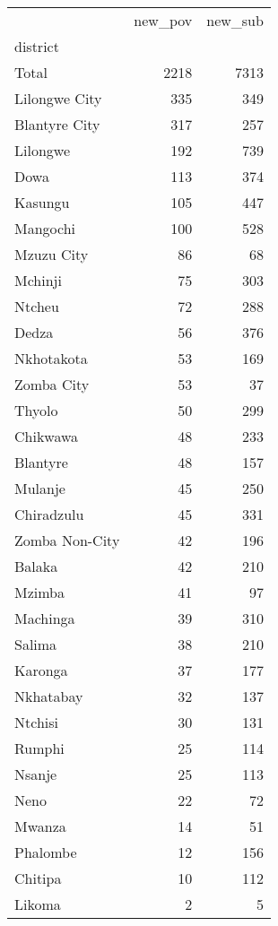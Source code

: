 \begin{tabular}{lrr}
\toprule
{} &  new\_pov &  new\_sub \\
district       &          &          \\
\midrule
Total          &     2218 &     7313 \\
Lilongwe City  &      335 &      349 \\
Blantyre City  &      317 &      257 \\
Lilongwe       &      192 &      739 \\
Dowa           &      113 &      374 \\
Kasungu        &      105 &      447 \\
Mangochi       &      100 &      528 \\
Mzuzu City     &       86 &       68 \\
Mchinji        &       75 &      303 \\
Ntcheu         &       72 &      288 \\
Dedza          &       56 &      376 \\
Nkhotakota     &       53 &      169 \\
Zomba City     &       53 &       37 \\
Thyolo         &       50 &      299 \\
Chikwawa       &       48 &      233 \\
Blantyre       &       48 &      157 \\
Mulanje        &       45 &      250 \\
Chiradzulu     &       45 &      331 \\
Zomba Non-City &       42 &      196 \\
Balaka         &       42 &      210 \\
Mzimba         &       41 &       97 \\
Machinga       &       39 &      310 \\
Salima         &       38 &      210 \\
Karonga        &       37 &      177 \\
Nkhatabay      &       32 &      137 \\
Ntchisi        &       30 &      131 \\
Rumphi         &       25 &      114 \\
Nsanje         &       25 &      113 \\
Neno           &       22 &       72 \\
Mwanza         &       14 &       51 \\
Phalombe       &       12 &      156 \\
Chitipa        &       10 &      112 \\
Likoma         &        2 &        5 \\
\bottomrule
\end{tabular}
